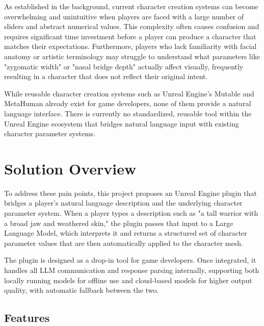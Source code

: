 As established in the background, current character creation systems can become overwhelming and unintuitive when players are faced with a large number of sliders and abstract numerical values. This complexity often causes confusion and requires significant time investment before a player can produce a character that matches their expectations. Furthermore, players who lack familiarity with facial anatomy or artistic terminology may struggle to understand what parameters like "zygomatic width" or "nasal bridge depth" actually affect visually, frequently resulting in a character that does not reflect their original intent.

While reusable character creation systems such as Unreal Engine's Mutable and MetaHuman already exist for game developers, none of them provide a natural language interface. There is currently no standardized, reusable tool within the Unreal Engine ecosystem that bridges natural language input with existing character parameter systems.

\section{Solution Overview}
\label{section:solution-overview}

To address these pain points, this project proposes an Unreal Engine plugin that bridges a player's natural language description and the underlying character parameter system. When a player types a description such as "a tall warrior with a broad jaw and weathered skin," the plugin passes that input to a Large Language Model, which interprets it and returns a structured set of character parameter values that are then automatically applied to the character mesh.

The plugin is designed as a drop-in tool for game developers. Once integrated, it handles all LLM communication and response parsing internally, supporting both locally running models for offline use and cloud-based models for higher output quality, with automatic fallback between the two.

\subsection{Features}
\label{subsection:features}

